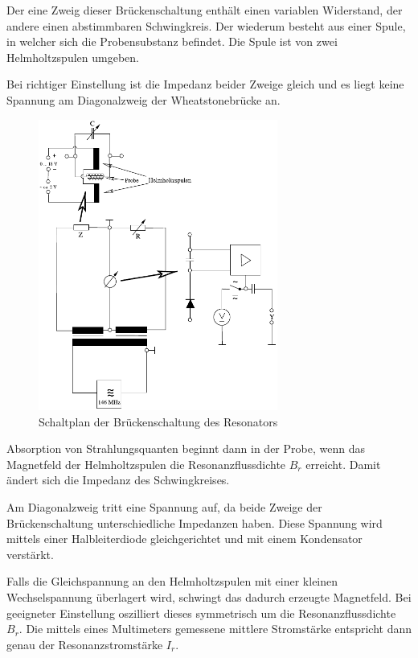 \documentclass[12pt,a4paper]{scrartcl}
\numberwithin{equation}{section} %
\begin{document}
Der eine Zweig dieser Brückenschaltung enthält einen variablen Widerstand, der andere einen abstimmbaren Schwingkreis. Der wiederum besteht aus einer Spule, in welcher sich die Probensubstanz befindet. Die Spule ist von zwei Helmholtzspulen umgeben.

Bei richtiger Einstellung ist die Impedanz beider Zweige gleich und es liegt keine Spannung am Diagonalzweig der Wheatstonebrücke an.

\begin{figure}[h!]
	\centering
	\includegraphics[width=0.7\textwidth]{../media/B1.5/Aufbau.pdf}
	\caption{Schaltplan der Brückenschaltung des Resonators \cite{Uni}}
	\label{fig:aufbau}
\end{figure}

Absorption von Strahlungsquanten beginnt dann in der Probe, wenn das Magnetfeld der Helmholtzspulen die Resonanzflussdichte $B_r$ erreicht. Damit ändert sich die Impedanz des Schwingkreises.

Am Diagonalzweig tritt eine Spannung auf, da beide Zweige der Brückenschaltung unterschiedliche Impedanzen haben. Diese Spannung wird mittels einer Halbleiterdiode gleichgerichtet und mit einem Kondensator verstärkt.

Falls die Gleichspannung an den Helmholtzspulen mit einer kleinen Wechselspannung überlagert wird, schwingt das dadurch erzeugte Magnetfeld. Bei geeigneter Einstellung oszilliert dieses symmetrisch um die Resonanzflussdichte $B_r$. Die mittels eines Multimeters gemessene mittlere Stromstärke entspricht dann genau der Resonanzstromstärke $I_r$.
\end{document}
